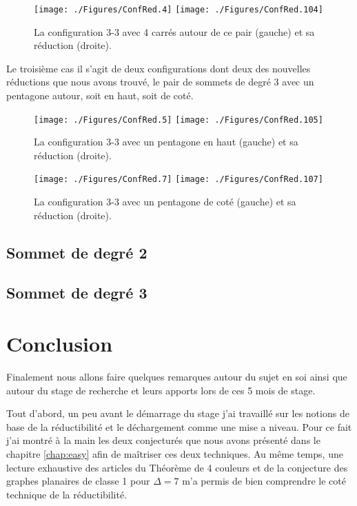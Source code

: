 \documentclass[10pt,a4paper]{article}
\begin{document}
\begin{figure}[ht]
\centerline{
\texttt{[image: ./Figures/ConfRed.4]}
\hfil
\texttt{[image: ./Figures/ConfRed.104]}
}
\caption{La configuration 3-3 avec 4 carrés autour de ce pair (gauche) et sa réduction (droite).}
\label{fig:33C}
\end{figure}

Le troisième cas il s'agit de deux configurations dont deux des nouvelles réductions que nous avons trouvé, le pair de sommets de degré 3 avec un pentagone autour, soit en haut, soit de coté.
\begin{figure}[ht]
\centerline{
\texttt{[image: ./Figures/ConfRed.5]}
\hfil
\texttt{[image: ./Figures/ConfRed.105]}
}
\caption{La configuration 3-3 avec un pentagone en haut (gauche) et sa réduction (droite).}
\label{fig:33PH}
\end{figure}

\begin{figure}[ht]
\centerline{
\texttt{[image: ./Figures/ConfRed.7]}
\hfil
\texttt{[image: ./Figures/ConfRed.107]}
}
\caption{La configuration 3-3 avec un pentagone de coté (gauche) et sa réduction (droite).}
\label{fig:33PC}
\end{figure}


\subsection{Sommet de degré 2}
\subsection{Sommet de degré 3}

\section{Conclusion}
\label{chap:concl}
Finalement nous allons faire quelques remarques autour du sujet en soi ainsi que autour du stage de recherche et leurs apports lors de ces 5 mois de stage.

Tout d'abord, un peu avant le démarrage du stage j'ai travaillé sur les notions de base de la réductibilité et le déchargement comme une mise a niveau. Pour ce fait j'ai montré à la main les deux conjecturés que nous avons présenté dans le chapitre \ref{chap:easy} afin de maîtriser ces deux techniques. Au même temps, une lecture exhaustive des articles du Théorème de 4 couleurs \cite{T4C} et de la conjecture des graphes planaires de classe 1 pour $\Delta = 7$ \cite{SandersZhao} m'a permis de bien comprendre le coté technique de la réductibilité. 
\end{document}

